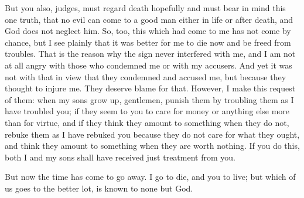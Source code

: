 But you also, judges, must regard death hopefully and must bear in mind this one truth,  that no evil can come to a good man either in life or after death, and God does not neglect him. So, too, this which had come to me has not come by chance, but I see plainly that it was better for me to die now and be freed from troubles. That is the reason why the sign never interfered with me, and I am not at all angry with those who condemned me or with my accusers. And yet it was not with that in view that they condemned and accused me, but because  they thought to injure me. They deserve blame for that. However, I make this request of them: when my sons grow up, gentlemen, punish them by troubling them as I have troubled you; if they seem to you to care for money or anything else more than for virtue, and if they think they amount to something when they do not, rebuke them as I have rebuked you because they do not care for what they ought, and think they amount to something when they are worth nothing. If you do this, both I and my sons  shall have received just treatment from you.

But now the time has come to go away. I go to die, and you to live; but which of us goes to the better lot, is known to none but God.